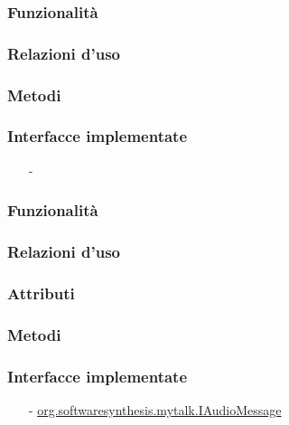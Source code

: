 
\subsubsection*{Funzionalità}

\subsubsection*{Relazioni d'uso}

\subsubsection*{Metodi}


\subsubsection*{Interfacce implementate}
\begin{itemize}[noitemsep,nolistsep]
  \item[-] 
\end{itemize}

\subsubsection*{Funzionalità}

\subsubsection*{Relazioni d'uso}

\subsubsection*{Attributi}

\subsubsection*{Metodi}


\subsubsection*{Interfacce implementate}
\begin{itemize}[noitemsep,nolistsep]
  \item[-] \hyperref[IAudioMessage]{\ttfamily{}org.softwaresynthesis.mytalk.IAudioMessage}
\end{itemize}

